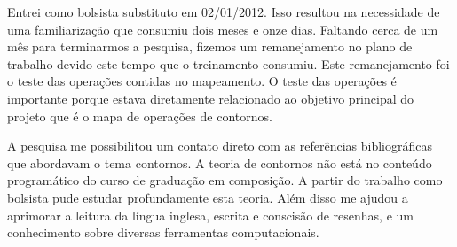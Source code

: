 \documentclass[11pt]{article}
\begin{document}
Entrei como bolsista substituto em 02/01/2012. Isso resultou na
necessidade de uma familiarização que consumiu dois meses e onze dias.
Faltando cerca de um mês para terminarmos a pesquisa, fizemos um
remanejamento no plano de trabalho devido este tempo que o treinamento
consumiu. Este remanejamento foi o teste das operações contidas no
mapeamento. O teste das operações é importante porque estava
diretamente relacionado ao objetivo principal do projeto que é o mapa
de operações de contornos.

A pesquisa me possibilitou um contato direto com as referências
bibliográficas que abordavam o tema contornos.  A teoria de contornos
não está no conteúdo programático do curso de graduação em composição.
A partir do trabalho como bolsista pude estudar profundamente esta
teoria.  Além disso me ajudou a aprimorar a leitura da língua inglesa,
escrita e conscisão de resenhas, e um conhecimento sobre diversas
ferramentas computacionais.


\renewcommand{\refname}{Referências bibliográficas (máximo 15)}

\nocite{
  Friedmann1985,
  Friedmann1987,
  Morris1987,
  Marvin1987,
  Marvin1988,
  Polansky1992,
  Morris1993,
  Clifford1995,
  Quinn1997,
  Beard2003,
  Sampaio2008,
  Schultz2008,
  Schultz2009,
  Bor2009
}






\end{document}
